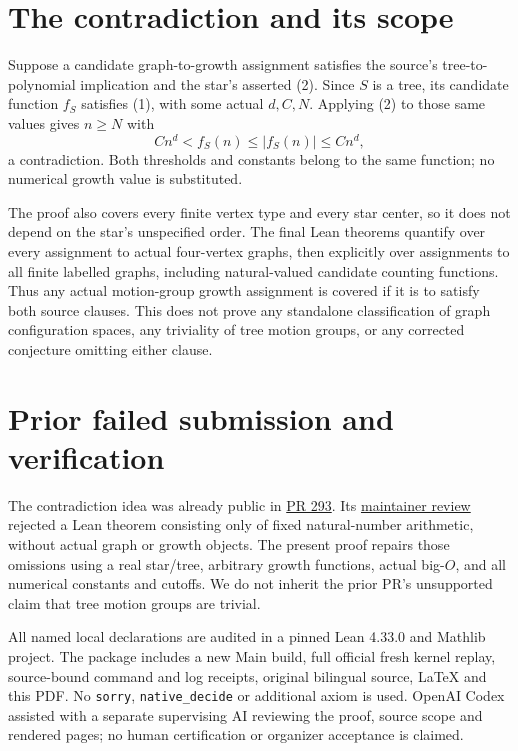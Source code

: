\documentclass[11pt]{article}
\begin{document}
\section{The contradiction and its scope}
Suppose a candidate graph-to-growth assignment satisfies the source's
tree-to-polynomial implication and the star's asserted (2).
Since $S$ is a tree, its candidate function $f_S$ satisfies (1), with
some actual $d,C,N$. Applying (2) to those same values gives $n\geq N$
with
\[
 Cn^d<f_S(n)\leq |f_S(n)|\leq Cn^d,
\]
a contradiction. Both thresholds and constants belong to the same
function; no numerical growth value is substituted.

The proof also covers every finite vertex type and every star center,
so it does not depend on the star's unspecified order. The final
Lean theorems quantify over every assignment to actual
four-vertex graphs, then explicitly over assignments to all finite
labelled graphs, including natural-valued candidate counting functions.
Thus any actual motion-group growth assignment is covered if it is to
satisfy both source clauses. This does not prove any standalone
classification of graph configuration spaces, any triviality of tree
motion groups, or any corrected conjecture omitting either clause.

\section{Prior failed submission and verification}
The contradiction idea was already public in
\href{https://github.com/The-Last-Math-Competition/The-Last-Math-Competition/pull/293}{PR 293}.
Its \href{https://github.com/The-Last-Math-Competition/The-Last-Math-Competition/pull/293\#issuecomment-5968931621}{maintainer review}
rejected a Lean theorem consisting only of fixed natural-number
arithmetic, without actual graph or growth objects. The present proof
repairs those omissions using a real star/tree, arbitrary growth
functions, actual big-$O$, and all numerical constants and cutoffs.
We do not inherit the prior PR's unsupported claim that tree motion
groups are trivial.

All named local declarations are audited in a pinned Lean 4.33.0 and
Mathlib project. The package includes a new Main build, full official
fresh kernel replay, source-bound command and log receipts, original
bilingual source, LaTeX and this PDF. No \texttt{sorry},
\texttt{native\_decide} or additional axiom is used. OpenAI Codex
assisted with a separate supervising AI reviewing the proof, source
scope and rendered pages; no human certification or organizer
acceptance is claimed.
\end{document}
